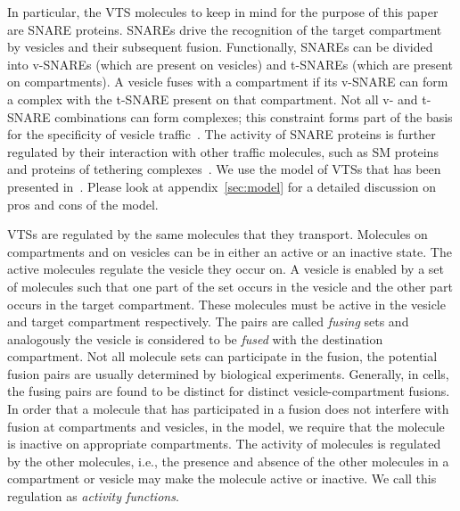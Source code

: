 %
In particular, the VTS molecules to keep in mind for the purpose of this paper are SNARE proteins. SNAREs drive the recognition of the target compartment by vesicles and their subsequent fusion. Functionally, SNAREs can be divided into v-SNAREs (which are present on vesicles) and t-SNAREs (which are present on compartments). A vesicle fuses with a compartment if its v-SNARE can form a complex with the t-SNARE present on that compartment. Not all v- and t- SNARE combinations can form complexes; this constraint forms part of the basis for the specificity of vesicle traffic~\cite{jahn2006snares}. The activity of SNARE proteins is further regulated by their interaction with other traffic molecules, such as SM proteins~\cite{sudhof2009membrane} and proteins of tethering complexes~\cite{hong2014tethering}.
%
We use the model of VTSs that has been presented in~\cite{shukla2017discovering}.
%
Please look at appendix~\ref{sec:model}
for a detailed discussion on pros and cons of the model.


VTSs are regulated by the same molecules that they transport. Molecules on compartments and on vesicles can be in either an active or an inactive state.
%
%
The active molecules regulate the vesicle they occur on.
%
A vesicle is enabled by a set of molecules
such that one part of the set occurs in the vesicle and the other part
occurs in the target compartment.
%
These molecules must be active in the vesicle
and target compartment respectively.
%
The pairs are called {\em fusing} sets and analogously
the vesicle is considered to be {\em fused} with the
destination compartment.
%
Not all molecule sets can participate in the fusion, the
potential fusion pairs are usually determined by biological experiments.
%
Generally, in cells, the fusing pairs are found to be distinct for distinct vesicle-compartment fusions.
%
In order that a molecule that has participated in a fusion does not interfere
with fusion at compartments and vesicles, in the model, we require that the molecule is inactive on appropriate compartments.
%
%
The activity of molecules is regulated by the other molecules, i.e.,
the presence and absence of the other molecules in a compartment or
vesicle may make the molecule active or inactive.
%
We call this regulation as {\em activity functions}.

